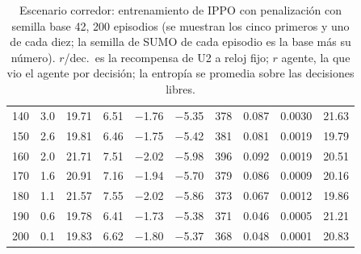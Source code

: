 \begin{table}[H]
\begin{tabular}{rrrrrrrrrr}
140 & 3.0 & 19.71 & 6.51 & $-$1.76 & $-$5.35 & 378 & 0.087 & 0.0030 & 21.63 \\
150 & 2.6 & 19.81 & 6.46 & $-$1.75 & $-$5.42 & 381 & 0.081 & 0.0019 & 19.79 \\
160 & 2.0 & 21.71 & 7.51 & $-$2.02 & $-$5.98 & 396 & 0.092 & 0.0019 & 20.51 \\
170 & 1.6 & 20.91 & 7.16 & $-$1.94 & $-$5.70 & 379 & 0.086 & 0.0009 & 20.16 \\
180 & 1.1 & 21.57 & 7.55 & $-$2.02 & $-$5.86 & 373 & 0.067 & 0.0012 & 19.86 \\
190 & 0.6 & 19.78 & 6.41 & $-$1.73 & $-$5.38 & 371 & 0.046 & 0.0005 & 21.21 \\
200 & 0.1 & 19.83 & 6.62 & $-$1.80 & $-$5.37 & 368 & 0.048 & 0.0001 & 20.83 \\
\bottomrule
\end{tabular}
\caption[Escenario corredor: entrenamiento de IPPO con penalización, semilla base 42]{Escenario corredor: entrenamiento de IPPO con penalización con semilla base 42, 200 episodios (se muestran los cinco primeros y uno de cada diez; la semilla de SUMO de cada episodio es la base más su número). $r$/dec.\ es la recompensa de U2 a reloj fijo; $r$ agente, la que vio el agente por decisión; la entropía se promedia sobre las decisiones libres.}
\label{tab:corredor-ippo-spill-42}
\end{table}

